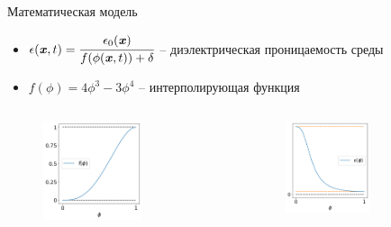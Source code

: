 \begin{frame}{Математическая модель}
\vspace{-0.2cm}
\begin{itemize}
	\item $\epsilon({\textbf{\textit{x}}}, t) = \cfrac{\epsilon_0({\textbf{\textit{x}}})}{f(\phi({\textbf{\textit{x}}}, t)) + \delta}$ -- диэлектрическая проницаемость среды
	\item $f(\phi) = 4 \phi^3 - 3 \phi^4$ -- интерполирующая функция
\end{itemize}
\begin{columns}
	\begin{figure}
		\hspace*{1.4cm}
		\includegraphics[width=0.65\textwidth]{figures/f_form.png}
	\end{figure}
	\begin{figure}
		\hspace*{-2cm}
		\includegraphics[width=0.60\textwidth]{figures/eps_form.png}
	\end{figure}
\end{columns}
\end{frame}


